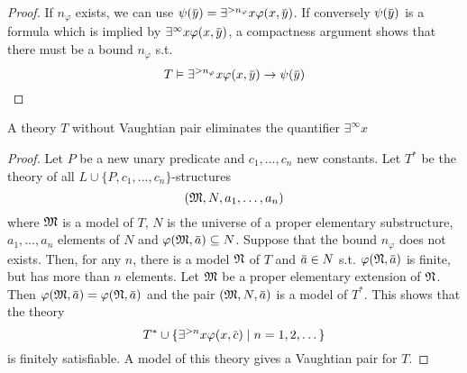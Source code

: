 \documentclass[11pt]{article}
\begin{document}
\begin{proof}
If \(n_\varphi\) exists, we can use \(\psi(\bary)=\exists^{>n_{\varphi}}x\varphi(x,\bary)\). If conversely \(\psi(\bary)\) is
a formula which is implied by \(\exists^\infty x\varphi(x,\bary)\), a compactness argument shows that there must
be a bound \(n_\varphi\) s.t.
\begin{equation*}
T\vDash\exists^{>n_\varphi}x\varphi(x,\bary)\to\psi(\bary)
\end{equation*}
\end{proof}

\begin{lemma}[]
A theory \(T\) without Vaughtian pair eliminates the quantifier \(\exists^\infty x\)
\end{lemma}


\begin{proof}
Let \(P\) be a new unary predicate and \(c_1,\dots,c_n\) new constants. Let \(T^*\) be the theory
of all \(L\cup\{P,c_1,\dots,c_n\}\)-structures
\begin{equation*}
(\mathfrak{M},N,a_1,\dots,a_n)
\end{equation*}
where \(\mathfrak{M}\) is a model of \(T\), \(N\) is the universe of a proper elementary substructure,
 \(a_1,\dots,a_n\) elements of \(N\) and \(\varphi(\fM,\bara)\subseteq N\).
Suppose that the
bound \(n_\varphi\) does not exists. Then, for any \(n\), there is a model \(\mathfrak{N}\) of \(T\)
and \(\bara\in N\) s.t. \(\varphi(\fN,\bara)\) is finite, but has more than \(n\) elements. Let \(\mathfrak{M}\) be a
proper elementary extension of \(\mathfrak{N}\).
Then \(\varphi(\fM,\bara)=\varphi(\fN,\bara)\)
and the pair \((\fM,N,\bara)\) is a model of \(T^*\). This shows
that the theory
\begin{equation*}
T^*\cup\{\exists^{>n}x\varphi(x,\barc)\mid n=1,2,\dots\}
\end{equation*}
is finitely satisfiable. A model of this theory gives a Vaughtian pair for \(T\).
\end{proof}
\end{document}
